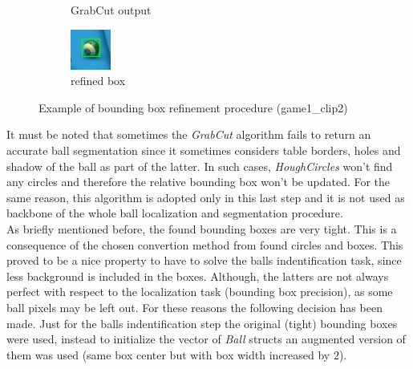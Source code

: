 \begin{figure}[h!]
\begin{subfigure}[b]{0.25\textwidth}
        \caption{GrabCut output}
    \end{subfigure}
    \hspace{0.05\textwidth}
    \begin{subfigure}[b]{0.25\textwidth}
        \centering
        \includegraphics[width=\textwidth]{imgs/ball_localization/bbox_after.jpg}
        \caption{refined box}
    \end{subfigure}
    \caption{Example of bounding box refinement procedure (game1\_clip2)}
    \label{fig:refine}
\end{figure}
It must be noted that sometimes the \textit{GrabCut} algorithm fails to return an accurate ball segmentation since it sometimes considers table borders, holes and shadow of the ball as part of the latter.
In such cases, \textit{HoughCircles} won't find any circles and therefore the relative bounding box won't be updated.
For the same reason, this algorithm is adopted only in this last step and it is not used as backbone of the whole ball localization and segmentation procedure.
\newline \\
As briefly mentioned before, the found bounding boxes are very tight. This is a consequence of the chosen convertion method from found circles and boxes.
This proved to be a nice property to have to solve the balls indentification task, since less background is included in the boxes.
Although, the latters are not always perfect with respect to the localization task (bounding box precision), as some ball pixels may be left out. For these reasons the following decision has been made.
Just for the balls indentification step the original (tight) bounding boxes were used, instead to initialize
the vector of \textit{Ball} structs an augmented version of them was used (same box center but with box width increased by $2$).